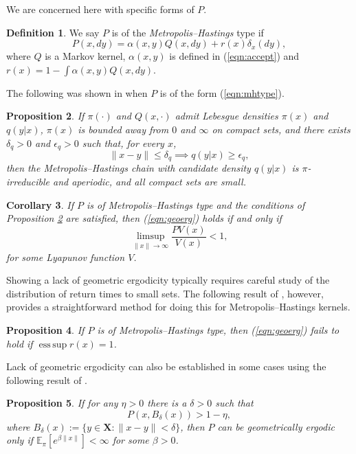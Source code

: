 \documentclass[bj,numbers,noshowframe]{imsart}
\newcommand{\X}{\mathbf{X}}
\DeclareMathOperator*{\esssup}{ess\,sup}
\theoremstyle{definition}
\newtheorem{defn}{Definition}[section]
\theoremstyle{plain}
\newtheorem{prop}[defn]{Proposition}
\newtheorem{crly}[defn]{Corollary}
\theoremstyle{definition}
\begin{document}
We are concerned here with specific forms of $P$.

\begin{defn} We say $P$ is of the \emph{Metropolis--Hastings} type if
\begin{equation} \label{eqn:mhtype}
P(x,dy) = \alpha(x,y)Q(x,dy) + r(x)\delta_x(dy),
\end{equation}
where $Q$ is a Markov kernel, $\alpha(x,y)$ is defined in (\ref{eqn:accept}) and $r(x) = 1- \int \alpha(x,y)Q(x,dy)$.
\end{defn}

The following was shown in \citep{roberts1996geometric} when $P$ is of the form (\ref{eqn:mhtype}).

\begin{prop} \label{prop:mh1}
If $\pi(\cdot)$ and $Q(x,\cdot)$ admit Lebesgue densities $\pi(x)$ and $q(y|x)$, $\pi(x)$ is bounded away from $0$ and $\infty$ on compact sets, and there exists $\delta_q>0$ and $\epsilon_q>0$ such that, for every $x$,
\[
\|x-y\| \leq \delta_q \implies q(y|x) \geq \epsilon_q,
\]
then the Metropolis--Hastings chain with candidate density $q(y|x)$ is $\pi$-irreducible and aperiodic, and all compact sets are small.
\end{prop}

\begin{crly} If $P$ is of Metropolis--Hastings type and the conditions of Proposition \ref{prop:mh1} are satisfied, then (\ref{eqn:geoerg}) holds if and only if
\begin{equation} \label{eqn:drift}
\limsup_{\|x\|\to\infty}\frac{PV(x)}{V(x)} < 1,
\end{equation}
for some Lyapunov function $V$.
\end{crly}

Showing a lack of geometric ergodicity typically requires careful study of the distribution of return times to small sets.  The following result of \citep{roberts1996geometric}, however, provides a straightforward method for doing this for Metropolis--Hastings kernels.

\begin{prop} \label{prop:supr}
If $P$ is of Metropolis--Hastings type, then (\ref{eqn:geoerg}) \emph{fails} to hold if
$\esssup r(x) = 1$.
\end{prop}

Lack of geometric ergodicity can also be established in some cases using the following result of \citep{jarner2003necessary}.

\begin{prop} \label{prop:tight}
If for any $\eta > 0$ there is a $\delta > 0$ such that
\begin{equation} \label{eqn:lackge2}
P(x,B_\delta(x)) > 1-\eta,
\end{equation}
where $B_\delta(x) :=\{ y \in \X : \|x-y\| < \delta \}$, then $P$ can be geometrically ergodic \emph{only} if $\mathbb{E}_\pi [e^{\beta \|x\|}] < \infty$ for some $\beta > 0$.
\end{prop}
\end{document}
